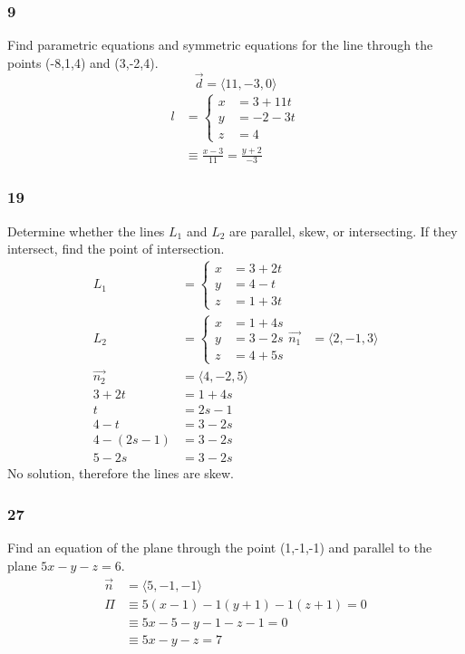 \documentclass{math}
\begin{document}
\subsubsection*{9}
Find parametric equations and symmetric equations for the line through the
points (-8,1,4) and (3,-2,4).
\[ \vec{d} = \langle11,-3,0\rangle \]
\begin{align*}
  l &= \begin{cases}
    x &= 3+11t \\
    y &= -2-3t \\
    z &= 4
  \end{cases} \\
  &\equiv \frac{x-3}{11} = \frac{y+2}{-3}
\end{align*}

\subsubsection*{19}
Determine whether the lines \( L_1 \) and \( L_2 \) are parallel, skew, or
intersecting. If they intersect, find the point of intersection.
\begin{align*}
  L_1 &= \begin{cases}
    x &= 3+2t \\
    y &= 4-t \\
    z &= 1+3t
  \end{cases} \\
  L_2 &= \begin{cases}
    x &= 1+4s \\
    y &= 3-2s \\
    z &= 4+5s
  \end{cases}
  \vec{n_1} &= \langle2,-1,3\rangle \\
  \vec{n_2} &= \langle4,-2,5\rangle \\
  3+2t &= 1+4s \\
  t &= 2s-1 \\
  4-t &= 3-2s \\
  4-(2s-1) &= 3-2s \\
  5-2s &= 3-2s
\end{align*}
No solution, therefore the lines are skew.

\subsubsection*{27}
Find an equation of the plane through the point (1,-1,-1) and parallel to the
plane \( 5x-y-z = 6 \).
\begin{align*}
  \vec{n} &= \langle5,-1,-1\rangle \\
  \Pi &\equiv 5(x-1)-1(y+1)-1(z+1) = 0 \\
  &\equiv 5x-5-y-1-z-1 = 0 \\
  &\equiv 5x-y-z = 7
\end{align*}
\end{document}
